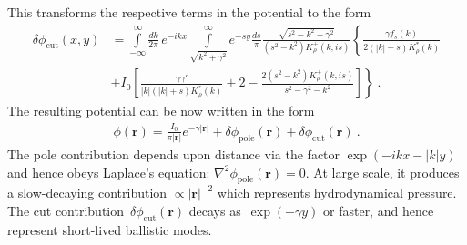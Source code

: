 \documentclass[preprint,aps,eqsecnum, prb]{revtex4-1}
\newcommand{\fplus}[1]{{#1}^{+}}
\begin{document}
This transforms the respective  terms in the potential to the form
\begin{align}
\delta\phi_\mathrm{cut}(x, y) &= \int\limits_{-\infty}^{\infty}\frac{dk}{2\pi}
\, e^{-ikx}
\int\limits_{\sqrt{k^2 + \gamma^2}}^{\infty} e^{-sy}\frac{ds}{\pi}
\frac{\sqrt{s^2 - k^2 - \gamma^2}}{(s^2 - k^2) \fplus{K}_\rho(k, is)}
\left\{
\frac{\gamma f_s(k)}{2(|k| + s)K_\rho^\ast(k)}
\right. \\ \nonumber
     &+ \left. I_0 \left[\frac{\gamma\gamma'}{|k|(|k| + s) K_\rho^\ast(k)}
       + 2 - \frac{2(s^2 - k^2) \fplus{K}_\rho(k, is)}{s^2
                             - \gamma^2 - k^2} \right]
       \right\}  \ .
\end{align}
The resulting potential can be now written in the form
\begin{align}
  \phi({\bm r}) = \frac{I_0}{\pi|{\bm r}|} e^{-\gamma |{\bm r}|}
  + \delta\phi_\mathrm{pole}({\bm r}) + \delta\phi_\mathrm{cut}({\bm r})\ . 
\end{align}
The pole contribution depends upon distance via the factor
$\exp(-ikx - |k| y)$ and hence obeys Laplace's equation:
$\nabla^2 \phi_\mathrm{pole}({\bm r}) = 0$. At large scale,
it produces a slow-decaying contribution $\propto |{\bm r}|^{-2}$
which represents hydrodynamical pressure. 
The cut contribution~$\delta\phi_\mathrm{cut}({\bm r})$
decays as~$\exp(-\gamma y)$ or faster,
and hence represent short-lived ballistic modes. 
\end{document}
